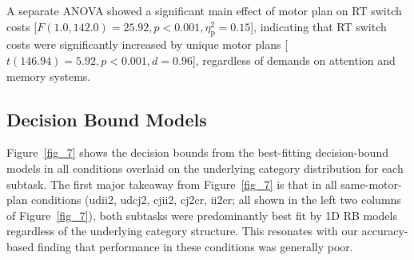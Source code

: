 \documentclass[doc, floatsintext]{apa7}
\begin{document}


A separate ANOVA showed a significant main effect of motor
plan on RT switch costs [$F(1.0, 142.0) = 25.92, p < 0.001,
\eta_{\text{p}}^{2} = 0.15$], indicating that RT switch
costs were significantly increased by unique motor plans
[$t(146.94) = 5.92, p < 0.001, d = 0.96$], regardless of
demands on attention and memory systems.

\subsection{Decision Bound Models}
Figure~\ref{fig_7} shows the decision bounds from the
best-fitting decision-bound models in all conditions
overlaid on the underlying category distribution for each
subtask. The first major takeaway from Figure~\ref{fig_7}
is that in all same-motor-plan conditions (udii2, udcj2,
cjii2, cj2cr, ii2cr; all shown in the left two columns of
Figure~\ref{fig_7}), both subtasks were predominantly best
fit by 1D RB models regardless of the underlying category
structure. This resonates with our accuracy-based finding
that performance in these conditions was generally poor. 
\end{document}
